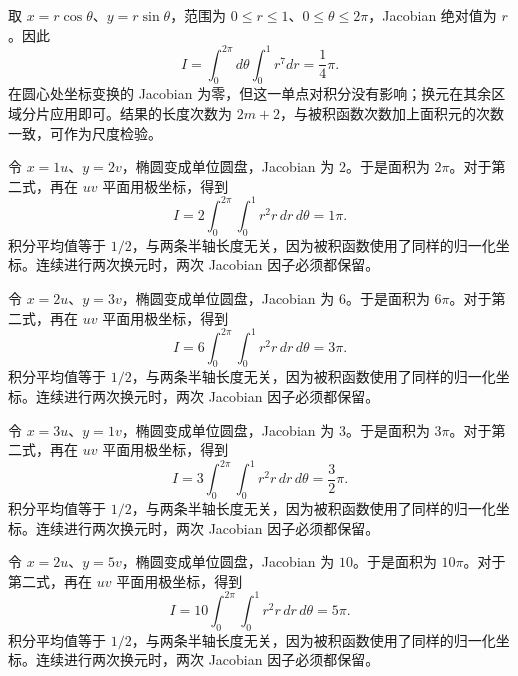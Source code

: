 \documentclass[UTF8,12pt,a4paper,fontset=fandol]{ctexart}
\begin{document}
\begin{solve}\label{ans:c36q19}
取 $x=r\cos\theta$、$y=r\sin\theta$，范围为 $0\le r\le 1$、$0\le\theta\le2\pi$，Jacobian 绝对值为 $r$。因此
\[
I=\int_0^{2\pi}d\theta\int_0^{1}r^{7}dr=\frac{1}{4}\pi.
\]
在圆心处坐标变换的 Jacobian 为零，但这一单点对积分没有影响；换元在其余区域分片应用即可。结果的长度次数为 $2m+2$，与被积函数次数加上面积元的次数一致，可作为尺度检验。
\end{solve}

\begin{solve}\label{ans:c36q20}
令 $x=1u$、$y=2v$，椭圆变成单位圆盘，Jacobian 为 $2$。于是面积为 $2\pi$。对于第二式，再在 $uv$ 平面用极坐标，得到
\[
I=2\int_0^{2\pi}\int_0^1r^2r\,dr\,d\theta=1\pi.
\]
积分平均值等于 $1/2$，与两条半轴长度无关，因为被积函数使用了同样的归一化坐标。连续进行两次换元时，两次 Jacobian 因子必须都保留。
\end{solve}

\begin{solve}\label{ans:c36q21}
令 $x=2u$、$y=3v$，椭圆变成单位圆盘，Jacobian 为 $6$。于是面积为 $6\pi$。对于第二式，再在 $uv$ 平面用极坐标，得到
\[
I=6\int_0^{2\pi}\int_0^1r^2r\,dr\,d\theta=3\pi.
\]
积分平均值等于 $1/2$，与两条半轴长度无关，因为被积函数使用了同样的归一化坐标。连续进行两次换元时，两次 Jacobian 因子必须都保留。
\end{solve}

\begin{solve}\label{ans:c36q22}
令 $x=3u$、$y=1v$，椭圆变成单位圆盘，Jacobian 为 $3$。于是面积为 $3\pi$。对于第二式，再在 $uv$ 平面用极坐标，得到
\[
I=3\int_0^{2\pi}\int_0^1r^2r\,dr\,d\theta=\frac{3}{2}\pi.
\]
积分平均值等于 $1/2$，与两条半轴长度无关，因为被积函数使用了同样的归一化坐标。连续进行两次换元时，两次 Jacobian 因子必须都保留。
\end{solve}

\begin{solve}\label{ans:c36q23}
令 $x=2u$、$y=5v$，椭圆变成单位圆盘，Jacobian 为 $10$。于是面积为 $10\pi$。对于第二式，再在 $uv$ 平面用极坐标，得到
\[
I=10\int_0^{2\pi}\int_0^1r^2r\,dr\,d\theta=5\pi.
\]
积分平均值等于 $1/2$，与两条半轴长度无关，因为被积函数使用了同样的归一化坐标。连续进行两次换元时，两次 Jacobian 因子必须都保留。
\end{solve}
\end{document}
